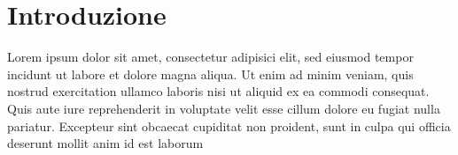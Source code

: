 
\chapter*{Introduzione}                 %

Lorem ipsum dolor sit amet, consectetur adipisici elit, sed eiusmod tempor incidunt ut labore et dolore magna aliqua. 
Ut enim ad minim veniam, quis nostrud exercitation ullamco laboris nisi ut aliquid ex ea commodi consequat. Quis aute iure reprehenderit in voluptate velit esse cillum dolore eu fugiat nulla pariatur. Excepteur sint obcaecat cupiditat non proident, sunt in culpa qui officia deserunt mollit anim id est laborum


